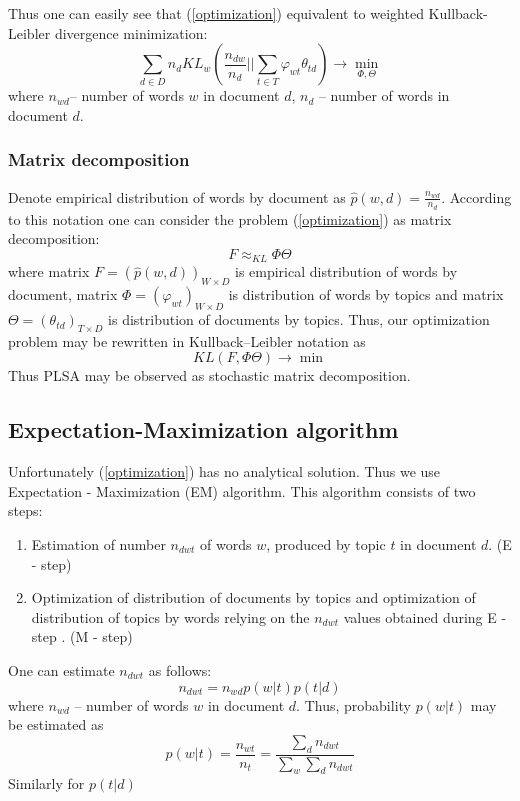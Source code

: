 	    Thus one can easily see that (\ref{optimization}) equivalent to weighted Kullback-Leibler divergence minimization:
	    \begin{equation}
		\sum_{d \in D} n_d KL_w \left( \frac{n_{dw}}{n_d} || \sum_{t \in T} \varphi_{wt}\theta_{td} \right) \to \min_{\Phi, \Theta}
	    \end{equation}
		where $n_{wd}$\--- number of words $w$ in document $d$, $n_d$ \--- number of words in document $d$.

	\subsubsection{Matrix decomposition}
	    Denote empirical distribution of words by document as $\hat{p}(w, d) = \frac{n_{wd}}{n_d}$.
	    According to this notation one can consider the problem (\ref{optimization}) as matrix decomposition:
	    \begin{equation} F \approx_{KL} \Phi \Theta \end{equation}
	    where matrix $F = (\hat{p}(w, d))_{W \times D}$ is empirical distribution of words by document,
	    matrix $\Phi = (\varphi_{wt})_{W \times D}$ is distribution of words by topics and
	    matrix  $\Theta = (\theta_{td})_{T\times D}$ is distribution of documents by topics.
	    Thus, our optimization problem may be rewritten in Kullback–Leibler notation as
	    \begin{equation} KL(F , \Phi \Theta) \rightarrow \min \end{equation}
	    Thus PLSA may be observed as stochastic matrix decomposition.

    \subsection{Expectation\--Maximization algorithm} \label{EMAlgorithm}
	    Unfortunately (\ref{optimization}) has no analytical solution. Thus we use Expectation \-- Maximization (EM) algorithm.
	    This algorithm consists of two steps:
	    \begin{enumerate}
		\item Estimation of number $n_{dwt}$ of words $w$, produced by topic $t$ in document $d$. (E \-- step)
		\item Optimization of distribution of documents by topics and optimization of distribution of topics by words relying on
		    the $n_{dwt}$ values obtained during E \-- step . (M \-- step)
	    \end{enumerate}
	    One can estimate $n_{dwt}$ as follows:
	    \begin{equation}  n_{dwt} = n_{wd} p(w|t) p(t|d) \end{equation}
	    where $n_{wd}$ \--- number of words $w$ in document $d$.
	    Thus, probability $p(w|t)$ may be estimated as
	    \begin{equation}  p(w|t) = \frac{n_{wt}}{n_t} = \frac{\sum_d n_{dwt} }{\sum_w \sum_d n_{dwt}}   \end{equation}
	    Similarly for $p(t|d)$


